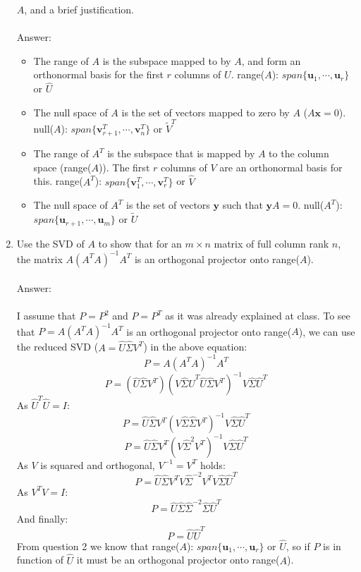\documentclass{article}
\renewcommand{\vec}[1]{\mathbf{#1}}
\newcommand{\x}{\vec{x}}
\begin{document}
\begin{enumerate}
$A$, and a brief justification.\\
\\
Answer:
\begin{itemize}
 \item The range of $A$ is the subspace mapped to by $A$, and form an orthonormal basis for the first $r$ columns of $U$. range($A$): $span\{\vec{u}_1,\cdots,\vec{u}_r\}$ or $\hat{U}$
 \item The null space of $A$ is the set of vectors mapped to zero by $A$ ($A\x=0$).  null($A$): $span\{\vec{v}^T_{r+1},\cdots,\vec{v}^T_n\}$ or $\tilde{V}^T$
 \item The range of $A^T$ is the subspace that is mapped by $A$ to the column space (range($A$)). The first $r$ columns of $V$ are an orthonormal basis for this. range($A^T$): $span\{\vec{v}^T_1,\cdots,\vec{v}^T_r\}$ or $\hat{V}$
 \item The null space of $A^T$ is the set of vectors $\vec{y}$ such that $\vec{y}A = 0$.  null($A^T$): $span\{\vec{u}_{r+1},\cdots,\vec{u}_m\}$ or $\tilde{U}$
\end{itemize}

\item Use the SVD of $A$ to show that for an $m \times n$ matrix of full column rank $n$, the matrix $A (A^TA)^{-1} A^T$ is an orthogonal
  projector onto range($A$).\\
\\
Answer:\\
\\
I assume that $P=P^2$ and $P=P^T$ as it was already explained at class.  To see that $P=A(A^TA)^{-1}A^T$ is an orthogonal projector onto range($A$), we can use the reduced SVD ($A=\hat{U}\hat{\Sigma}V^T$) in the above equation:
$$P=A(A^TA)^{-1}A^T$$
$$P=(\hat{U}\hat{\Sigma}V^T)(V\hat{\Sigma}\hat{U}^T\hat{U}\hat{\Sigma}V^T )^{-1}V\hat{\Sigma}\hat{U}^T$$
As $\hat{U}^T\hat{U}=I$:
$$P=\hat{U}\hat{\Sigma}V^T(V\hat{\Sigma}\hat{\Sigma}V^T )^{-1}V\hat{\Sigma}\hat{U}^T$$
$$P=\hat{U}\hat{\Sigma}V^T(V\hat{\Sigma}^2V^T )^{-1}V\hat{\Sigma}\hat{U}^T$$
As $V$ is squared and orthogonal, $V^{-1}=V^T$ holds:
$$P=\hat{U}\hat{\Sigma}V^TV\hat{\Sigma}^{-2}V^TV\hat{\Sigma}\hat{U}^T$$
As $V^TV=I$:
$$P=\hat{U}\hat{\Sigma}\hat{\Sigma}^{-2}\hat{\Sigma}\hat{U}^T$$
And finally:
$$P=\hat{U}\hat{U}^T$$
From question 2 we know that range($A$): $span\{\vec{u}_1,\cdots,\vec{u}_r\}$ or $\hat{U}$, so if $P$ is in function of $\hat{U}$ it must be an orthogonal projector onto range($A$).
  
  
\end{enumerate}
\end{document}
